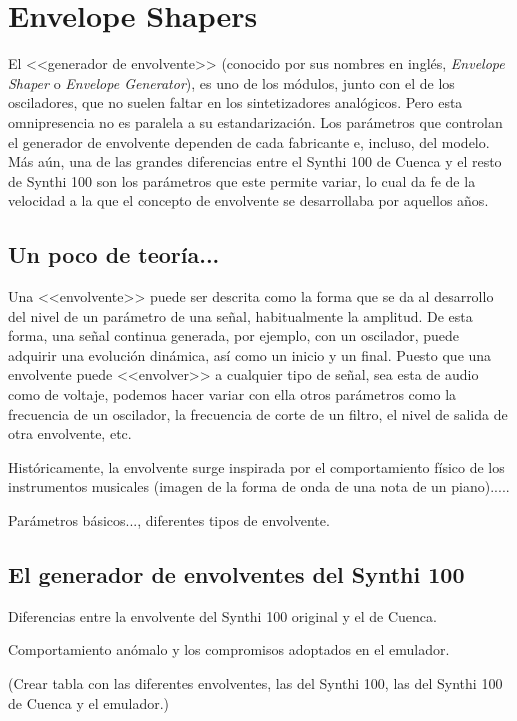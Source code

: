 \section{Envelope Shapers}

El <<generador de envolvente>> (conocido por sus nombres en inglés, \textit{Envelope Shaper} o \textit{Envelope Generator}), es uno de los módulos, junto con el de los osciladores, que no suelen faltar en los sintetizadores analógicos. Pero esta omnipresencia no es paralela a su estandarización. Los parámetros que controlan el generador de envolvente dependen de cada fabricante e, incluso, del modelo. Más aún, una de las grandes diferencias entre el Synthi 100 de Cuenca y el resto de Synthi 100 son los parámetros que este permite variar, lo cual da fe de la velocidad a la que el concepto de envolvente se desarrollaba por aquellos años.

\subsection{Un poco de teoría...}

Una <<envolvente>> puede ser descrita como la forma que se da al desarrollo del nivel de un parámetro de una señal, habitualmente la amplitud. De esta forma, una señal continua generada, por ejemplo, con un oscilador, puede adquirir una evolución dinámica, así como un inicio y un final. Puesto que una envolvente puede <<envolver>> a cualquier tipo de señal, sea esta de audio como de voltaje, podemos hacer variar con ella otros parámetros como la frecuencia de un oscilador, la frecuencia de corte de un filtro, el nivel de salida de otra envolvente, etc.

Históricamente, la envolvente surge inspirada por el comportamiento físico de los instrumentos musicales (imagen de la forma de onda de una nota de un piano).....

Parámetros básicos..., diferentes tipos de envolvente.

\subsection{El generador de envolventes del Synthi 100}

Diferencias entre la envolvente del Synthi 100 original y el de Cuenca.

Comportamiento anómalo y los compromisos adoptados en el emulador.

(Crear tabla con las diferentes envolventes, las del Synthi 100, las del Synthi 100 de Cuenca y el emulador.)